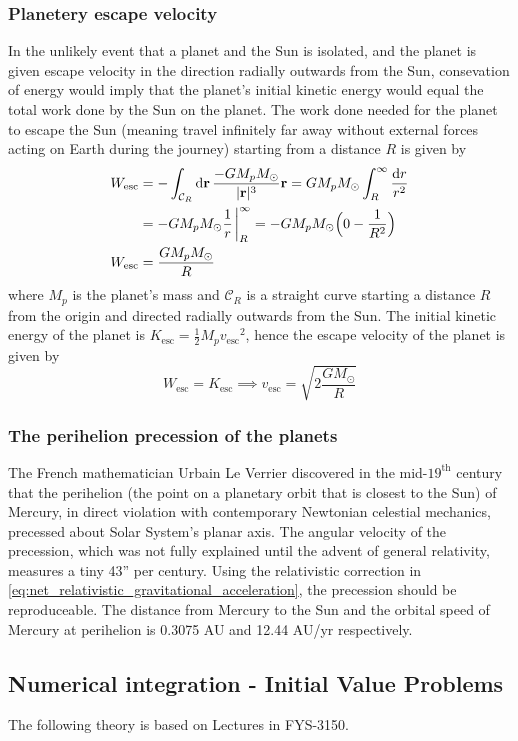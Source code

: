 \documentclass[reprint,english]{revtex4-1}
\begin{document}
\subsubsection{Planetery escape velocity}
In the unlikely event that a planet and the Sun is isolated, and the planet is given escape velocity in the direction radially outwards from the Sun, consevation of energy would imply that the planet's initial kinetic energy would equal the total work done by the Sun on the planet. The work done needed for the planet to escape the Sun (meaning travel infinitely far away without external forces acting on Earth during the journey) starting from a distance \(R\) is given by
\begin{align}
W_\text{esc}&=-\int_{\mathcal{C}_R}\dd{\vb{r}}\frac{-GM_pM_\odot}{|\vb{r}|^3}\vb{r}=GM_pM_\odot\int_R^\infty\frac{\dd{r}}{r^2}\nonumber\\
&=-GM_pM_\odot\frac{1}{r}\eval_R^\infty=-GM_pM_\odot\Big(0-\frac{1}{R^2}\Big)\nonumber\\
W_\text{esc}&=\frac{GM_pM_\odot}{R}
\end{align}
where \(M_p\) is the planet's mass and \(\mathcal{C}_R\) is a straight curve starting a distance \(R\) from the origin and directed radially outwards from the Sun. The initial kinetic energy of the planet is \(K_\text{esc}=\frac{1}{2}M_p{v_\text{esc}}^2\), hence the escape velocity of the planet is given by
\begin{equation}\label{eq:escape_velocity}
W_\text{esc}=K_\text{esc}\implies v_\text{esc}=\sqrt{2\frac{GM_\odot}{R}}
\end{equation}
\subsubsection{The perihelion precession of the planets}
The French mathematician Urbain Le Verrier discovered in the mid-\(19^\text{th}\) century that the perihelion (the point on a planetary orbit that is closest to the Sun) of Mercury, in direct violation with contemporary Newtonian celestial mechanics, precessed about Solar System's planar axis. The angular velocity of the precession, which was not fully explained until the advent of general relativity, measures a tiny 43'' per century. Using the relativistic correction in \eqref{eq:net_relativistic_gravitational_acceleration}, the precession should be reproduceable. The distance from Mercury to the Sun and the orbital speed of Mercury at perihelion is 0.3075 AU and 12.44 AU/yr respectively.
\subsection{Numerical integration - Initial Value Problems}
The following theory is based on Lectures in FYS-3150. \cite{lecture_ode}
\end{document}
